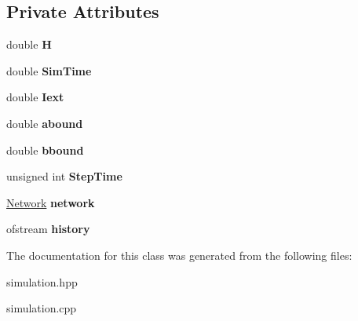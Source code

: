 \subsection*{Private Attributes}
\begin{DoxyCompactItemize}
\item 
\hypertarget{classSimulation_a06acac1ee6268724d0d0c60bc272cd33}{double {\bfseries H}}\label{classSimulation_a06acac1ee6268724d0d0c60bc272cd33}

\item 
\hypertarget{classSimulation_a9aaa7fb92d29408dcd2ed047f157a312}{double {\bfseries Sim\-Time}}\label{classSimulation_a9aaa7fb92d29408dcd2ed047f157a312}

\item 
\hypertarget{classSimulation_a3f746da9d0b57dbeb4c72b57ffde91cd}{double {\bfseries Iext}}\label{classSimulation_a3f746da9d0b57dbeb4c72b57ffde91cd}

\item 
\hypertarget{classSimulation_a9a11a936a9b132496a928a5c0c7748c3}{double {\bfseries abound}}\label{classSimulation_a9a11a936a9b132496a928a5c0c7748c3}

\item 
\hypertarget{classSimulation_ab0076d61568b86e2143f30619777dece}{double {\bfseries bbound}}\label{classSimulation_ab0076d61568b86e2143f30619777dece}

\item 
\hypertarget{classSimulation_aa69e2e4b137d75f5dd9ee2af06ad0887}{unsigned int {\bfseries Step\-Time}}\label{classSimulation_aa69e2e4b137d75f5dd9ee2af06ad0887}

\item 
\hypertarget{classSimulation_a7b3ddbe6f43ec8b5fee95f1a5cdedbbe}{\hyperlink{classNetwork}{Network} {\bfseries network}}\label{classSimulation_a7b3ddbe6f43ec8b5fee95f1a5cdedbbe}

\item 
\hypertarget{classSimulation_a7a3ddfe9784f7d965ea2ee98c7cff64e}{ofstream {\bfseries history}}\label{classSimulation_a7a3ddfe9784f7d965ea2ee98c7cff64e}

\end{DoxyCompactItemize}


The documentation for this class was generated from the following files\-:\begin{DoxyCompactItemize}
\item 
simulation.\-hpp\item 
simulation.\-cpp\end{DoxyCompactItemize}
